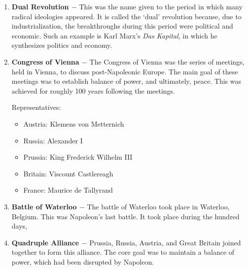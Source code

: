 \documentclass[12pt]{article}
\begin{document}
\begin{enumerate}

\item \textbf{Dual Revolution $-$} This was the name given to the period in which many radical ideologies appeared. It is called the `dual' revolution because, due to industrialization, the breakthroughs during this period were political and economic. Such an example is Karl Marx's \textit{Das Kapital}, in which he synthesizes politics and economy.

\item \textbf{Congress of Vienna $-$} The Congress of Vienna was the series of meetings, held in Vienna, to discuss post-Napoleonic Europe. The main goal of these meetings was to establish balance of power, and ultimately, peace. This was achieved for roughly 100 years following the meetings.

\begin{center}

Representatives:

\end{center}

\begin{itemize}

\item Austria: Klemens von Metternich

\item Russia: Alexander I

\item Prussia: King Frederick Wilhelm III

\item Britain: Viscount Castlereagh

\item France: Maurice de Tallyrand

\end{itemize}

\item \textbf{Battle of Waterloo $-$} The battle of Waterloo took place in Waterloo, Belgium. This was Napoleon's last battle. It took place during the hundred days,

\item \textbf{Quadruple Alliance $-$} Prussia, Russia, Austria, and Great Britain joined together to form this alliance. The core goal was to maintain a balance of power, which had been disrupted by Napoleon.


\end{enumerate}
\end{document}
